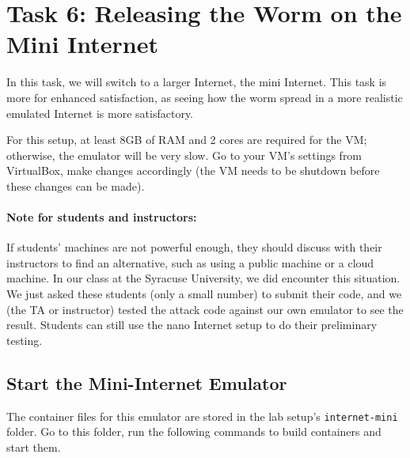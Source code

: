 \section{Task 6: Releasing the Worm on the Mini Internet} 

In this task, we will switch to a larger Internet, the mini Internet. 
This task is more for enhanced satisfaction, as seeing
how the worm spread in a more realistic emulated Internet is more 
satisfactory. 

For this setup, at least 8GB of RAM and 2 cores are required 
for the VM; otherwise, the emulator will be very slow. Go to your VM's settings
from VirtualBox, make changes accordingly (the VM needs to be shutdown
before these changes can be made).

\paragraph{Note for students and instructors:} 
If students' machines are not powerful enough, 
they should discuss with their instructors to 
find an alternative, such as using a public machine 
or a cloud machine. In our class at the Syracuse University, 
we did encounter this situation. We just asked these students (only a small number)
to submit their code, and we (the TA or instructor) tested the attack 
code against our own emulator to see the result. Students can 
still use the nano Internet setup to do their preliminary testing. 




\subsection{Start the Mini-Internet Emulator} 

The container files for this emulator are stored 
in the lab setup's \texttt{internet-mini} folder. Go to this folder,
run the following commands to build containers and start them.


